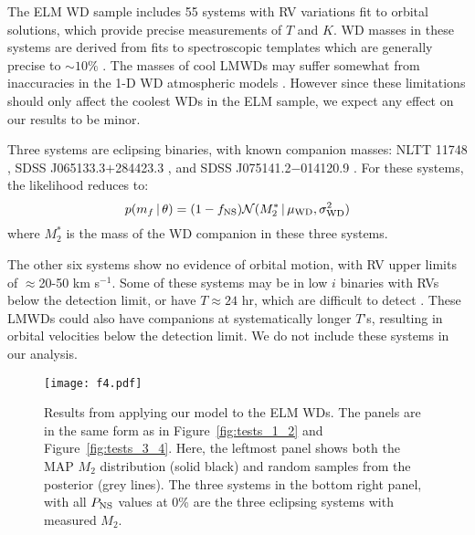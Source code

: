 \documentclass[apjl]{emulateapj}
\newcommand{\given}{\,|\,}
\newcommand{\Msun}{\ifmmode {{\rm M}_{\odot}}\else M$_{\odot}$\fi}
\newcommand{\period}{T}
\newcommand{\mf}{m_f}
\begin{document}
The ELM WD sample includes 55 systems with RV variations fit to orbital solutions, which provide precise measurements of $\period$ and $K$. WD masses in these systems are derived from fits to spectroscopic templates which are generally precise to $\sim10\%$ \citep{gianninas14}. The masses of cool LMWDs may suffer somewhat from 
inaccuracies in the 1-D WD atmospheric models \citep{tremblay13}. However since these limitations should only affect the coolest WDs in the ELM sample, we expect any effect on our results to be minor.




Three systems are eclipsing binaries, with known companion masses: NLTT 11748 \citep[$M_2=0.72~\Msun$;][]{kaplan14}, SDSS J065133.3$+$284423.3 \citep[$M_2=0.50~\Msun$;][]{brown11b}, and SDSS J075141.2$-$014120.9 \citep[$M_2=0.97~\Msun$;][]{kilic14}. For these systems, the likelihood reduces to:
\begin{equation}
p(\mf \given \theta) = (1-f_{\rm NS}) \mathcal{N}(M_2^* \given \mu_{\rm WD}, \sigma^2_{\rm WD})
\end{equation}
where $M_2^*$ is the mass of the WD companion in these three systems. 

The other six systems show no evidence of orbital motion, with RV upper limits of $\approx$20-50 km s$^{-1}$. Some of these systems may be in low $i$ binaries with RVs below the detection limit, or have $\period\approx24$ hr, which are difficult to detect \citep{ELMV}. These LMWDs could also have companions at systematically longer $\period$'s, resulting in orbital velocities below the detection limit. We do not include these systems in our analysis.

\begin{figure*}[h!]
\begin{center}
\texttt{[image: f4.pdf]}
\caption{Results from applying our model to the ELM WDs. 
The panels are in the same form as in Figure~\ref{fig:tests_1_2} and Figure~\ref{fig:tests_3_4}. 
Here, the leftmost panel shows both the MAP $M_2$ distribution (solid black) and random samples from the posterior (grey lines). 
The three systems in the bottom right panel, with all $P_{\rm NS}$ values at 0\% are the three eclipsing systems with measured $M_2$.
}
\label{fig:ELM_post}
\end{center}
\end{figure*}
\end{document}
